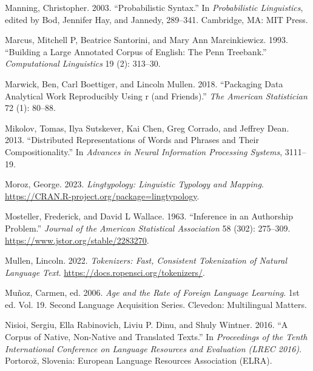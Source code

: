 \documentclass[
  letterpaper,
  DIV=11,
  numbers=noendperiod]{scrreport}
\newlength{\cslhangindent}
\newlength{\cslentryspacingunit} %
\newenvironment{CSLReferences}[2] %
 {%
  \setlength{\parindent}{0pt}
  \ifodd #1
  \let\oldpar\par
  \def\par{\hangindent=\cslhangindent\oldpar}
  \fi
  \setlength{\parskip}{#2\cslentryspacingunit}
 }%
 {}
\theoremstyle{definition}
\theoremstyle{remark}
\begin{document}
\begin{CSLReferences}{1}{0}
\leavevmode{}%
Manning, Christopher. 2003. {``Probabilistic Syntax.''} In
\emph{Probabilistic Linguistics}, edited by Bod, Jennifer Hay, and
Jannedy, 289--341. Cambridge, MA: MIT Press.

\leavevmode{}%
Marcus, Mitchell P, Beatrice Santorini, and Mary Ann Marcinkiewicz.
1993. {``Building a Large Annotated Corpus of English: The Penn
Treebank.''} \emph{Computational Linguistics} 19 (2): 313--30.

\leavevmode{}%
Marwick, Ben, Carl Boettiger, and Lincoln Mullen. 2018. {``Packaging
Data Analytical Work Reproducibly Using r (and Friends).''} \emph{The
American Statistician} 72 (1): 80--88.

\leavevmode{}%
Mikolov, Tomas, Ilya Sutskever, Kai Chen, Greg Corrado, and Jeffrey
Dean. 2013. {``Distributed Representations of Words and Phrases and
Their Compositionality.''} In \emph{Advances in Neural Information
Processing Systems}, 3111--19.

\leavevmode{}%
Moroz, George. 2023. \emph{Lingtypology: Linguistic Typology and
Mapping}. \url{https://CRAN.R-project.org/package=lingtypology}.

\leavevmode{}%
Mosteller, Frederick, and David L Wallace. 1963. {``Inference in an
Authorship Problem.''} \emph{Journal of the American Statistical
Association} 58 (302): 275--309.
\url{https://www.jstor.org/stable/2283270}.

\leavevmode{}%
Mullen, Lincoln. 2022. \emph{Tokenizers: Fast, Consistent Tokenization
of Natural Language Text}. \url{https://docs.ropensci.org/tokenizers/}.

\leavevmode{}%
Muñoz, Carmen, ed. 2006. \emph{Age and the Rate of Foreign Language
Learning}. 1st ed. Vol. 19. Second Language Acquisition Series.
Clevedon: Multilingual Matters.

\leavevmode{}%
Nisioi, Sergiu, Ella Rabinovich, Liviu P. Dinu, and Shuly Wintner. 2016.
{``A Corpus of Native, Non-Native and Translated Texts.''} In
\emph{Proceedings of the Tenth International Conference on Language
Resources and Evaluation (LREC 2016)}. Portoro{z̆}, Slovenia: European
Language Resources Association (ELRA).


\end{CSLReferences}
\end{document}
